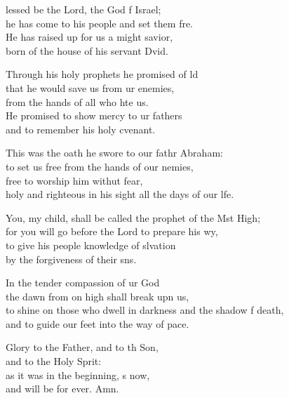 \settowidth{\versewidth}{to shine on those who dwell in darkness and the shadow of death, *}
\begin{psalmverse}%
  \begin{patverse}
lessed be the Lord, the God f Israel;\Med\\
he has come to his people and set them fre.\\
He has raised up for us a might savior,\Med\\
born of the house of his servant Dvid.

Through his holy prophets he promised of ld\Flex\\
that he would save us from ur enemies,\Med\\
from the hands of all who hte us.\\
He promised to show mercy to ur fathers\Med\\
and to remember his holy cvenant.

This was the oath he swore to our fathr Abraham:\Med\\
to set us free from the hands of our nemies,\\
free to worship him withut fear,\Med\\
holy and righteous in his sight all the days of our l\pointup{\i}fe.

You, my child, shall be called the prophet of the Mst High;\Med\\
for you will go before the Lord to prepare his wy,\\
to give his people knowledge of slvation\Med\\
by the forgiveness of their s\pointup{\i}ns.

In the tender compassion of ur God\Med\\
the dawn from on high shall break upn us,\\
to shine on those who dwell in darkness and the shadow f death,\Med\\
and to guide our feet into the way of pace.

Glory to the Father, and to th Son,\Med\\
and to the Holy Sp\pointup{\i}rit:\\
as it was in the beginning, \pointup{\i}s now,\Med\\
and will be for ever. Amn.
  \end{patverse}
  \end{psalmverse}
